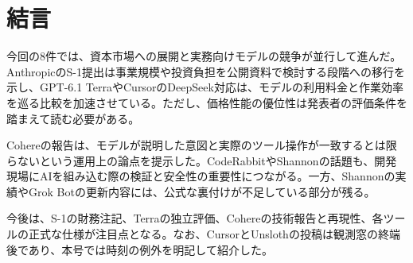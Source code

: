 \section*{結言}
今回の8件では、資本市場への展開と実務向けモデルの競争が並行して進んだ。AnthropicのS-1提出は事業規模や投資負担を公開資料で検討する段階への移行を示し、GPT-6.1 TerraやCursorのDeepSeek対応は、モデルの利用料金と作業効率を巡る比較を加速させている。ただし、価格性能の優位性は発表者の評価条件を踏まえて読む必要がある。

Cohereの報告は、モデルが説明した意図と実際のツール操作が一致するとは限らないという運用上の論点を提示した。CodeRabbitやShannonの話題も、開発現場にAIを組み込む際の検証と安全性の重要性につながる。一方、Shannonの実績やGrok Botの更新内容には、公式な裏付けが不足している部分が残る。

今後は、S-1の財務注記、Terraの独立評価、Cohereの技術報告と再現性、各ツールの正式な仕様が注目点となる。なお、CursorとUnslothの投稿は観測窓の終端後であり、本号では時刻の例外を明記して紹介した。
